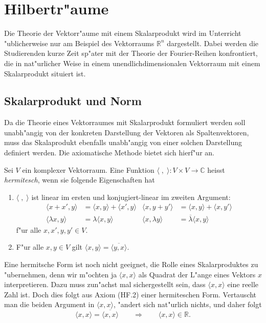 %
%
%
\chapter{Hilbertr"aume
\label{chapter:hilbertspaces}}
Die Theorie der Vektorr"aume mit einem Skalarprodukt wird im Unterricht
"ublicherweise nur am Beispiel des Vektorraums $\mathbb R^n$ dargestellt.
Dabei werden die Studierenden kurze Zeit sp"ater mit der Theorie
der Fourier-Reihen konfrontiert, die in nat"urlicher Weise in einem
unendlichdimensionalen Vektorraum mit einem Skalarprodukt situiert ist.

\section{Skalarprodukt und Norm}
Da die Theorie eines Vektorraumes mit Skalarprodukt formuliert werden
soll unabh"angig von der konkreten Darstellung der Vektoren als 
Spaltenvektoren, muss das Skalaprodukt ebenfalls unabh"angig von einer
solchen Darstellung definiert werden.
Die axiomatische Methode bietet sich hierf"ur an.

\begin{definition}
\label{hilbert:hermitescheform}
Sei $V$ ein komplexer Vektorraum.
Eine Funktion $\langle\;,\;\rangle\colon V\times V\to\mathbb C$ heisst
{\em hermitesch}, wenn sie folgende Eigenschaften hat
\begin{enumerate}[label={\bf HF.\arabic*},itemsep=0mm]
\item $\langle\;,\;\rangle$ ist linear im ersten und konjugiert-linear
im zweiten Argument:
\begin{align*}
\langle x+x',y\rangle &=\langle x,y\rangle + \langle x',y\rangle
&
\langle x,y+y'\rangle &=\langle x,y\rangle + \langle x,y'\rangle
\\
\langle\lambda x,y\rangle&=\lambda\langle x,y\rangle
&
\langle x,\lambda y\rangle&=\overline\lambda\langle x,y\rangle
\end{align*}
f"ur alle $x,x',y,y'\in V$.
\item F"ur alle $x,y\in V$ gilt
$\langle x,y\rangle=\overline{\langle y,x\rangle}$.
\end{enumerate}
\end{definition}
Eine hermitsche Form ist noch nicht geeignet, die Rolle eines
Skalarproduktes zu "ubernehmen, denn wir m"ochten ja $\langle x,x\rangle$
als Quadrat der L"ange eines Vektors $x$ interpretieren.
Dazu muss zun"achst mal sichergestellt sein, dass $\langle x,x\rangle$
eine reelle Zahl ist.
Doch dies folgt aus Axiom (HF.2) einer hermiteschen Form.
Vertauscht man die beiden Argument in $\langle x,x\rangle$, "andert
sich nat"urlich nichts, und daher folgt
\[
\langle x,x\rangle = \overline{\langle x,x\rangle}
\qquad\Rightarrow\qquad
\langle x,x\rangle\in\mathbb R.
\]

